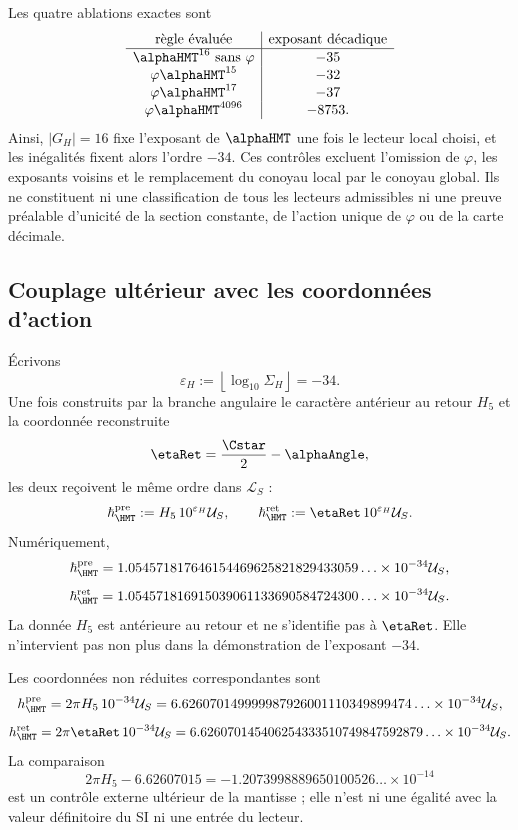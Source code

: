 Les quatre ablations exactes sont
\[
\begin{array}{c|c}
\text{règle évaluée}&\text{exposant décadique}\\
\hline
\alphaHMT^{16}\ \text{sans }\varphi&-35\\
\varphi\alphaHMT^{15}&-32\\
\varphi\alphaHMT^{17}&-37\\
\varphi\alphaHMT^{4096}&-8753.
\end{array}
\]
Ainsi, \(|G_H|=16\) fixe l'exposant de \(\alphaHMT\) une fois le
lecteur local choisi, et les inégalités fixent alors l'ordre \(-34\). Ces
contrôles excluent l'omission de \(\varphi\), les exposants voisins et le
remplacement du conoyau local par le conoyau global. Ils ne constituent ni une
classification de tous les lecteurs admissibles ni une preuve préalable d'unicité
de la section constante, de l'action unique de \(\varphi\) ou de la
carte décimale.

\subsection{Couplage ultérieur avec les coordonnées d'action}

Écrivons
\[
\varepsilon_H:=\left\lfloor\log_{10}\Sigma_H\right\rfloor=-34.
\]
Une fois construits par la branche angulaire le caractère antérieur au retour \(H_5\)
et la coordonnée reconstruite
\[
\etaRet=\frac{\Cstar}{2}-\alphaAngle,
\]
les deux reçoivent le même ordre dans \(\mathcal L_S\) :
\[
\hbar_{\HMT}^{\rm pre}
:=H_5\,10^{\varepsilon_H}\mathcal U_S,
\qquad
\hbar_{\HMT}^{\rm ret}
:=\etaRet\,10^{\varepsilon_H}\mathcal U_S.
\]
Numériquement,
\[
\hbar_{\HMT}^{\rm pre}
=1.054571817646154469625821829433059\ldots
\times10^{-34}\mathcal U_S,
\]
\[
\hbar_{\HMT}^{\rm ret}
=1.054571816915039061133690584724300\ldots
\times10^{-34}\mathcal U_S.
\]
La donnée \(H_5\) est antérieure au retour et ne s'identifie pas à \(\etaRet\).
Elle n'intervient pas non plus dans la démonstration de l'exposant \(-34\).

Les coordonnées non réduites correspondantes sont
\[
h_{\HMT}^{\rm pre}
=2\pi H_5\,10^{-34}\mathcal U_S
=6.626070149999987926001110349899474\ldots
\times10^{-34}\mathcal U_S,
\]
\[
h_{\HMT}^{\rm ret}
=2\pi\etaRet\,10^{-34}\mathcal U_S
=6.626070145406254333510749847592879\ldots
\times10^{-34}\mathcal U_S.
\]
La comparaison
\[
2\pi H_5-6.62607015
=-1.2073998889650100526\ldots\times10^{-14}
\]
est un contrôle externe ultérieur de la mantisse ; elle n'est ni une égalité avec la
valeur définitoire du SI ni une entrée du lecteur.

